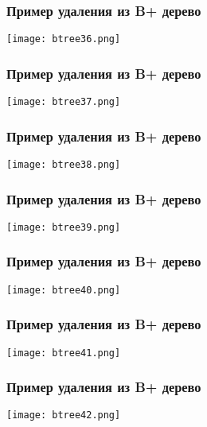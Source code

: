 \begin{frame}
\frametitle{Пример удаления из B+ дерево}
\begin{center}
  \texttt{[image: btree36.png]}
\end{center}
\end{frame}

\begin{frame}
\frametitle{Пример удаления из B+ дерево}
\begin{center}
  \texttt{[image: btree37.png]}
\end{center}
\end{frame}

\begin{frame}
\frametitle{Пример удаления из B+ дерево}
\begin{center}
  \texttt{[image: btree38.png]}
\end{center}
\end{frame}

\begin{frame}
\frametitle{Пример удаления из B+ дерево}
\begin{center}
  \texttt{[image: btree39.png]}
\end{center}
\end{frame}

\begin{frame}
\frametitle{Пример удаления из B+ дерево}
\begin{center}
  \texttt{[image: btree40.png]}
\end{center}
\end{frame}

\begin{frame}
\frametitle{Пример удаления из B+ дерево}
\begin{center}
  \texttt{[image: btree41.png]}
\end{center}
\end{frame}

\begin{frame}
\frametitle{Пример удаления из B+ дерево}
\begin{center}
  \texttt{[image: btree42.png]}
\end{center}
\end{frame}

